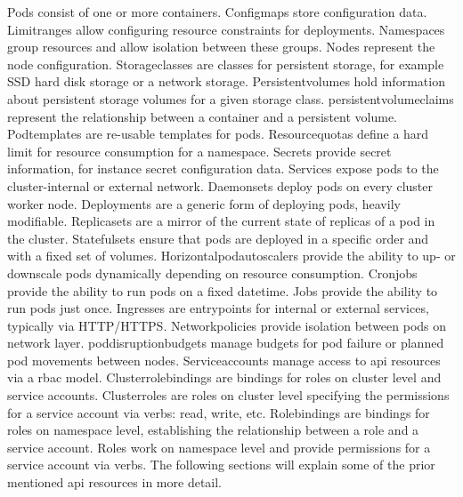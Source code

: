 \documentclass[titlepage]{report}
\begin{document}
Pods consist of one or more containers. Configmaps store configuration data. Limitranges allow configuring resource constraints for deployments. Namespaces group resources and allow isolation between these groups.
Nodes represent the node configuration. Storageclasses are classes for persistent storage, for example SSD hard disk storage or a network storage. Persistentvolumes hold information about persistent storage volumes for a given storage class.
persistentvolumeclaims represent the relationship between a container and a persistent volume. Podtemplates are re-usable templates for pods. Resourcequotas define a hard limit for resource consumption for a namespace.
Secrets provide secret information, for instance secret configuration data. Services expose pods to the cluster-internal or external network. Daemonsets deploy pods on every cluster worker node. Deployments are a generic form of deploying pods, heavily modifiable.
Replicasets are a mirror of the current state of replicas of a pod in the cluster. Statefulsets ensure that pods are deployed in a specific order and with a fixed set of volumes. Horizontalpodautoscalers provide the ability to up- or downscale pods dynamically depending on resource consumption.
Cronjobs provide the ability to run pods on a fixed datetime. Jobs provide the ability to run pods just once. Ingresses are entrypoints for internal or external services, typically via HTTP/HTTPS. Networkpolicies provide isolation between pods on network layer.
poddisruptionbudgets manage budgets for pod failure or planned pod movements between nodes. Serviceaccounts manage access to \gls{api} resources via a \gls{rbac} model. Clusterrolebindings are bindings for roles on cluster level and service accounts.
Clusterroles are roles on cluster level specifying the permissions for a service account via verbs: read, write, etc. Rolebindings are bindings for roles on namespace level, establishing the relationship between a role and a service account.
Roles work on namespace level and provide permissions for a service account via verbs. The following sections will explain some of the prior mentioned \gls{api} resources in more detail.
\end{document}
